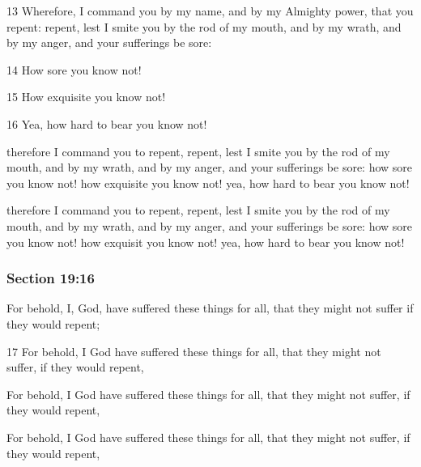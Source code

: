 		\begin{framed}
		\scriptsize
			\begin{compactdesc}
				\item[JSP] 13 Wherefore, I command you by my name, and by my Almighty power, that you repent: repent, lest I smite you by the rod of my mouth, and by my wrath, and by my anger, and your sufferings be sore:

					14 How sore you know not!

					15 How exquisite you know not!

					16 Yea, how hard to bear you know not!
				\item[RB1] [\textit{missing}]
				\item[DC 1835] therefore I command you to repent, repent, lest I smite you by the rod of my mouth, and by my wrath, and by my anger, and your sufferings be sore: how sore you know not! how exquisite you know not! yea, how hard to bear you know not! 
				\item[DC 1844] therefore I command you to repent, repent, lest I smite you by the rod of my mouth, and by my wrath, and by my anger, and your sufferings be sore: how sore you know not! how exquisit you know not! yea, how hard to bear you know not! 
			\end{compactdesc}
		\end{framed}

	\subsubsection{Section 19:16} %
		\label{DC19-16}

		For behold, I, God, have suffered these things for all, that they might not suffer if they would repent;

		\begin{framed}
		\scriptsize
			\begin{compactdesc}
				\item[JSP] 17 For behold, I God have suffered these things for all, that they might not suffer, if they would repent,
				\item[RB1] [\textit{missing}]
				\item[DC 1835] For behold, I God have suffered these things for all, that they might not suffer, if they would repent, 
				\item[DC 1844] For behold, I God have suffered these things for all, that they might not suffer, if they would repent, 
			\end{compactdesc}
		\end{framed}

